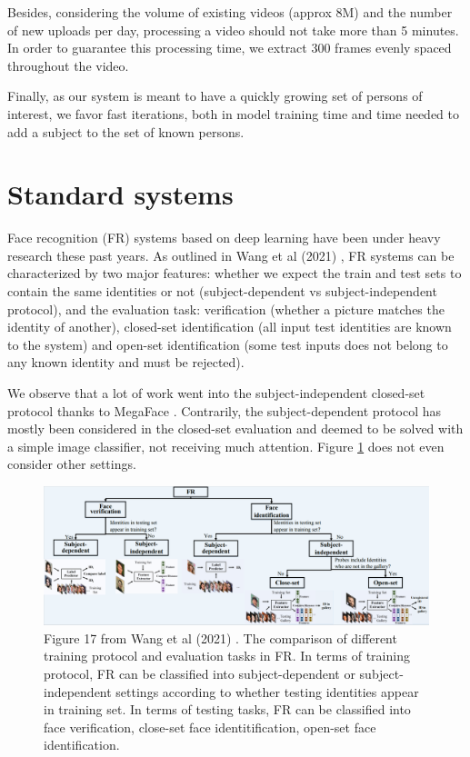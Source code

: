 Besides, considering the volume of existing videos (approx 8M) and the number of new uploads per day, processing a video should not take more than 5 minutes. In order to guarantee this processing time, we extract 300 frames evenly spaced throughout the video.

Finally, as our system is meant to have a quickly growing set of persons of interest, we favor fast iterations, both in model training time and time needed to add a subject to the set of known persons.

\section{Standard systems}

Face recognition (FR) systems based on deep learning have been under heavy research these past years. As outlined in Wang et al (2021) \cite{survey}, FR systems can be characterized by two major features: whether we expect the train and test sets to contain the same identities or not (subject-dependent vs subject-independent protocol), and the evaluation task: verification (whether a picture matches the identity of another), closed-set identification (all input test identities are known to the system) and open-set identification (some test inputs does not belong to any known identity and must be rejected).

We observe that a lot of work went into the subject-independent closed-set protocol thanks to MegaFace \cite{megaface}. Contrarily, the subject-dependent protocol has mostly been considered in the closed-set evaluation and deemed to be solved with a simple image classifier, not receiving much attention. Figure \ref{fig:survey} does not even consider other settings.

\begin{figure}
    \centering
    \includegraphics[width=\columnwidth]{50-files/survey.png}
    \caption{Figure 17 from Wang et al (2021) \cite{survey}. The comparison of different training protocol and evaluation tasks in FR. In terms of training protocol, FR can be classified into subject-dependent or subject-independent settings according to whether testing identities appear in training set. In terms of testing tasks, FR can be classified into face verification, close-set face identitification, open-set face identification.}
    \label{fig:survey}
\end{figure}

